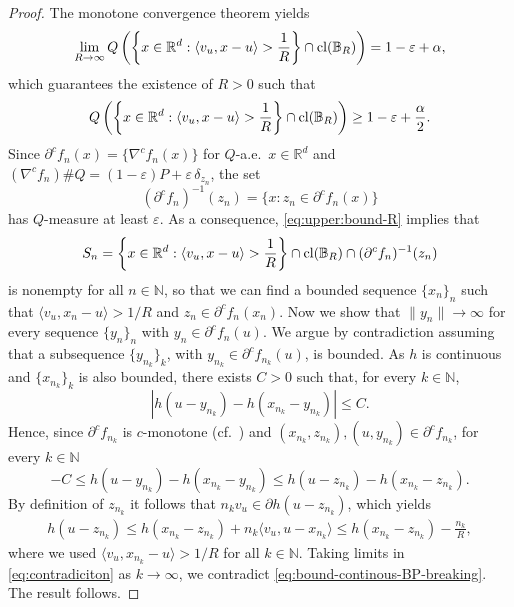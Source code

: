 \documentclass[11pt]{article}
\newcommand{\RR}{\mathbb{R}}
\newcommand{\R}{\RR}
\newcommand{\NN}{\mathbb{N}}
\theoremstyle{plain}
\theoremstyle{definition}\newtheorem{definition}[theorem]{Definition}
\theoremstyle{remark}
\begin{document}
\begin{proof}  
%
%
%
The monotone convergence theorem yields
$$ \lim_{R\to \infty} Q\left( \left\{ x\in\mathbb{R}^d: \langle v_u, x-u\rangle > \frac{1}{R}\right\} \cap  {\rm cl}(\mathbb{B}_{R})\right) = 1-  \varepsilon+\alpha ,$$
which guarantees the existence of $R>0$ such that
\begin{equation}
    \label{eq:upper:bound-R}
    Q\left( \left\{ x\in\mathbb{R}^d: \langle v_u, x-u\rangle > \frac{1}{R}\right\} \cap  {\rm cl}(\mathbb{B}_{R})\right)\geq  1- \varepsilon+\frac{\alpha }{2}.  
\end{equation}
Since $\partial^c f_{n}(x)= \{\nabla^c f_n(x)\}$ for $Q$-a.e.~$x\in \R^d$ and  $(\nabla^c f_{n})\# Q= (1-\varepsilon)P+\varepsilon\, \delta_{z_n}$, the set
$$(\partial^c f_{n})^{-1}(z_n)=  \{ x:  z_n\in \partial^c f_{n}(x) \}
$$
has $Q$-measure at least $ \varepsilon$. As a consequence, \eqref{eq:upper:bound-R} implies  that 
%
$$S_n=  \left\{ x\in\mathbb{R}^d: \langle v_u, x-u\rangle > \frac{1}{R}\right\} \cap  {\rm cl}(\mathbb{B}_{R})\cap  (\partial^c f_{n})^{-1}(z_n) $$ 
%
is nonempty for all $n\in \NN$, so that  we can find a bounded sequence $\{x_n\}_n $ such that 
$ \langle v_u, x_n-u\rangle > 1/R $ and $z_n\in \partial^c f_n(x_n)$. Now we show that $\|y_n\|\to \infty$ for every sequence $\{y_n\}_n$ with $y_n\in \partial^c f_n(u)$. We argue by contradiction assuming that a subsequence $\{ y_{n_k}\}_{k} $, with $y_{n_k}\in \partial^c f_{n_k}(u)$, is bounded. As $h$ is continuous and $\{ x_{n_k}\}_{k} $  is also bounded, there exists $C>0$ such that, for every $k\in \NN$, 
%
$$ | h(u- y_{n_k})-h(x_{n_k}- y_{n_k}) |\leq C. $$
%
Hence, since $\partial^c f_{n_k}$ is $c$-monotone (cf.~) and $(x_{n_k}, z_{n_k}), (u, y_{n_k}) \in \partial^c f_{n_k}$,   for every $k\in \NN$ %
\begin{equation}
    \label{eq:bound-continous-BP-breaking}
-C \leq  h(u- y_{n_k})-h(x_{n_k}- y_{n_k}) \leq h(u- z_{n_k}) -h(x_{n_k}- z_{n_k}).
\end{equation}
By definition of $z_{n_k}$ it follows that $n_k v_u \in \partial h(u- z_{n_k})$, which yields
\begin{align}\label{eq:contradiciton}
 h(u- z_{n_k}) \leq h(x_{n_k}- z_{n_k}) +n_k  \langle v_u,  u-x_{n_k} \rangle  \leq  h(x_{n_k}- z_{n_k}) - \frac{n_k}{R}, 
\end{align}
where we 
used  $ \langle v_u, x_{n_k}-u\rangle > 1/R $ for all $k\in \NN$. %
%
%
Taking limits in \eqref{eq:contradiciton} as $k\to \infty$, we contradict \eqref{eq:bound-continous-BP-breaking}. The result follows. 

\end{proof}
\end{document}
